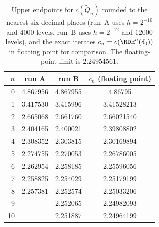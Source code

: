 \begin{table}[ht]
\caption{Upper endpoints for $c(\tilde Q_n)$ rounded to the nearest six decimal places
(run~A uses $h=2^{-10}$ and $4000$ levels, run~B uses $h=2^{-12}$ and $12000$ levels),
and the exact iterates
$c_n=c(\RDE^n(\delta_0))$ in floating point for comparison. The floating-point limit is
$2.24954561$.}\label{tab:certificates-stages}
\begin{tabular}{@{}rccc@{}}
\toprule
$n$ & run A & run B & $c_n$ (floating point) \\
\midrule
0 & 4.867956 & 4.867955 & 4.86795 \\
1 & 3.417530 & 3.415996 & 3.41528213 \\
2 & 2.665068 & 2.661760 & 2.66021540 \\
3 & 2.404165 & 2.400021 & 2.39808802 \\
4 & 2.308352 & 2.303815 & 2.30169894 \\
5 & 2.274755 & 2.270053 & 2.26786005 \\
6 & 2.262954 & 2.258185 & 2.25596056 \\
7 & 2.258825 & 2.254029 & 2.25179199 \\
8 & 2.257381 & 2.252574 & 2.25033206 \\
9 & & 2.252065 & 2.24982093 \\
10 & & 2.251887 & 2.24964199 \\
\bottomrule
\end{tabular}
\end{table}

